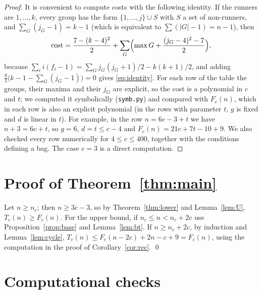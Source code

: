 \documentclass[11pt]{article}
\theoremstyle{remark}
\begin{document}
\begin{proof}
It is convenient to compute costs with the following identity. If the runners are $1,\dots,k$, every group has the form $\{1,\dots,j\}\cup S$ with $S$ a set of non-runners, and $\sum_G (j_G-1)=k-1$ (which is equivalent to $\sum(|G|-1)=n-1$), then
\begin{equation}\label{eq:identity}
\text{cost}=\frac{7-(k-4)^2}{2}+\sum_{G}\Bigl(\max G+\frac{(j_G-4)^2-7}{2}\Bigr),
\end{equation}
because $\sum_i i(f_i-1)=\sum_G j_G(j_G+1)/2-k(k+1)/2$, and adding $\frac92\bigl(k-1-\sum_G(j_G-1)\bigr)=0$ gives \eqref{eq:identity}. For each row of the table the groups, their maxima and their $j_G$ are explicit, so the cost is a polynomial in $c$ and $t$; we computed it symbolically (\texttt{symb.py}) and compared with $F_c(n)$, which in each row is also an explicit polynomial (in the rows with parameter $t$, $g$ is fixed and $d$ is linear in $t$). For example, in the row $n=6c-3+t$ we have $n+3=6c+t$, so $g=6$, $d=t\le c-4$ and $F_c(n)=21c+7t-10+9$. We also checked every row numerically for $4\le c\le400$, together with the conditions defining a bag. The case $c=3$ is a direct computation.
\end{proof}

\section{Proof of Theorem~\ref{thm:main}}

Let $n\ge n_c$; then $n\ge 3c-3$, so by Theorem~\ref{thm:lower} and Lemma~\ref{lem:U}, $T_c(n)\ge F_c(n)$. For the upper bound, if $n_c\le n<n_c+2c$ use Proposition~\ref{prop:base} and Lemma~\ref{lem:bt}. If $n\ge n_c+2c$, by induction and Lemma~\ref{lem:cycle}, $T_c(n)\le F_c(n-2c)+2n-c+9=F_c(n)$, using the computation in the proof of Corollary~\ref{cor:rec}. \qed

\section{Computational checks}
\end{document}
